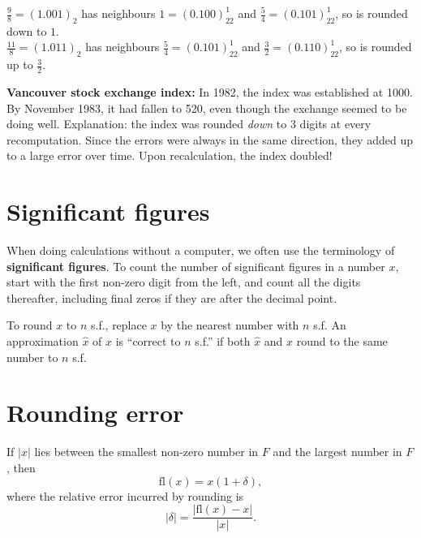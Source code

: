 \documentclass[
  letterpaper,
  DIV=11,
  numbers=noendperiod]{scrreprt}
\begin{document}
\(\tfrac98 = (1.001)_2\) has neighbours \(1 = (0.100)_22^1\) and
\(\tfrac54 = (0.101)_22^1\), so is rounded down to \(1\).\\
\(\tfrac{11}{8} = (1.011)_2\) has neighbours \(\tfrac54 = (0.101)_22^1\)
and \(\tfrac32=(0.110)_22^1\), so is rounded up to \(\tfrac32\).

\begin{tcolorbox}[enhanced jigsaw, toptitle=1mm, breakable, colbacktitle=quarto-callout-note-color!10!white, colback=white, opacitybacktitle=0.6, rightrule=.15mm, bottomrule=.15mm, left=2mm, arc=.35mm, bottomtitle=1mm, title=\textcolor{quarto-callout-note-color}{\faInfo}\hspace{0.5em}{Note}, titlerule=0mm, toprule=.15mm, leftrule=.75mm, opacityback=0, colframe=quarto-callout-note-color-frame, coltitle=black]

\textbf{Vancouver stock exchange index:} In 1982, the index was
established at 1000. By November 1983, it had fallen to 520, even though
the exchange seemed to be doing well. Explanation: the index was rounded
\emph{down} to 3 digits at every recomputation. Since the errors were
always in the same direction, they added up to a large error over time.
Upon recalculation, the index doubled!

\end{tcolorbox}

\section{Significant figures}\label{significant-figures}

When doing calculations without a computer, we often use the terminology
of \textbf{significant figures}. To count the number of significant
figures in a number \(x\), start with the first non-zero digit from the
left, and count all the digits thereafter, including final zeros if they
are after the decimal point.

To round \(x\) to \(n\) s.f., replace \(x\) by the nearest number with
\(n\) s.f. An approximation \(\hat{x}\) of \(x\) is ``correct to \(n\)
s.f.'' if both \(\hat{x}\) and \(x\) round to the same number to \(n\)
s.f.

\section{Rounding error}\label{rounding-error}

If \(|x|\) lies between the smallest non-zero number in \(F\) and the
largest number in \(F\), then \[
\mathrm{fl}(x) = x(1+\delta),
\] where the relative error incurred by rounding is \[
|\delta| = \frac{|\mathrm{fl}(x) - x|}{|x|}.
\]
\end{document}
